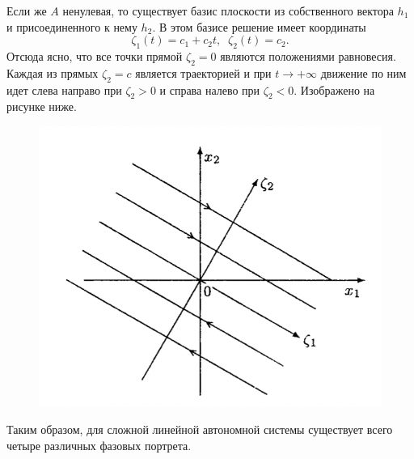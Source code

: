 \begin{enumerate}[label=(\alph*)]
        Если же $A$ ненулевая, то существует базис плоскости из собственного вектора $h_1$ и присоединенного к нему $h_2$. В этом базисе  решение имеет координаты 
        \[\zeta_1(t) = c_1 + c_2 t, \;\; \zeta_2(t) = c_2.\]
        Отсюда ясно, что все точки прямой $\zeta_2= 0$ являются положениями равновесия. Каждая из прямых $\zeta_2 = c$ является траекторией и при \(t \longrightarrow +\infty\) движение по ним идет слева направо при $\zeta_2>0$ и справа налево при $\zeta_2<0$. Изображено на рисунке ниже.
        \begin{figure}[H]\label{autonom-trivialb}
            \centering
            \includegraphics[scale=0.6]{sections/Sasha/images/autonom-trivialb.png}
            \caption{}
        \end{figure}
\end{enumerate}

Таким образом, для сложной линейной автономной системы существует всего четыре различных фазовых портрета.
